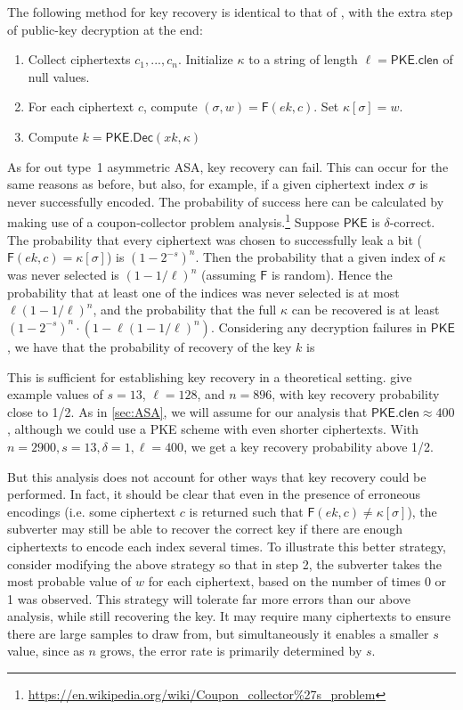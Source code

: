 The following method for key recovery is identical to that of \cite{CCS:BelJaeKan15}, with the extra step of public-key decryption at the end:
\begin{enumerate}\itemsep0em
\item Collect ciphertexts $c_1,...,c_n$. Initialize $\kappa$ to a string of length $\ell=\mathsf{PKE.clen}$ of null values. 
\item For each ciphertext $c$, compute $(\sigma, w) = \mathsf{F}(ek, c)$. Set $\kappa[\sigma]=w$.
\item Compute $k = \mathsf{PKE.Dec}(xk, \kappa)$
\end{enumerate}

As for out type~1 asymmetric ASA, key recovery can fail. This can occur for the same reasons as before, but also, for example, if a given ciphertext index $\sigma$ is never successfully encoded. The probability of success here can be calculated by making use of a coupon-collector problem analysis.\footnote{\url{https://en.wikipedia.org/wiki/Coupon_collector\%27s_problem}} Suppose $\mathsf{PKE}$ is $\delta$-correct. The probability that every ciphertext was chosen to successfully leak a bit ($\mathsf{F}(ek, c) = \kappa[\sigma]$) is $(1-2^{-s})^n$. Then the probability that a given index of $\kappa$ was never selected is $(1-1/\ell)^n$ (assuming $\mathsf{F}$ is random). Hence the probability that at least one of the indices was never selected is at most $\ell (1-1/\ell)^n$, and the probability that the full $\kappa$ can be recovered is at least $(1-2^{-s})^n\cdot (1-\ell (1-1/\ell)^n)$. Considering any decryption failures in $\mathsf{PKE}$, we have that the probability of recovery of the key $k$ is

This is sufficient for establishing key recovery in a theoretical setting. \cite{CCS:BelJaeKan15} give example values of $s=13$, $\ell=128$, and $n=896$, with key recovery probability close to 1/2. As in \autoref{sec:ASA}, we will assume for our analysis that $\mathsf{PKE.clen}\approx 400$, although we could use a PKE scheme with even shorter ciphertexts. With $n=2900,s=13,\delta=1,\ell=400$, we get a key recovery probability above 1/2.

But this analysis does not account for other ways that key recovery could be performed. In fact, it should be clear that even in the presence of erroneous encodings (i.e. some ciphertext $c$ is returned such that $\mathsf{F}(ek, c) \not = \kappa[\sigma]$), the subverter may still be able to recover the correct key if there are enough ciphertexts to encode each index several times. To illustrate this better strategy, consider modifying the above strategy so that in step 2, the subverter takes the most probable value of $w$ for each ciphertext, based on the number of times 0 or 1 was observed. This strategy will tolerate far more errors than our above analysis, while still recovering the key. It may require many ciphertexts to ensure there are large samples to draw from, but simultaneously it enables a smaller $s$ value, since as $n$ grows, the error rate is primarily determined by $s$.

